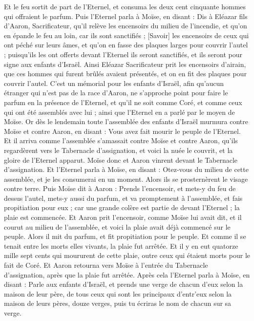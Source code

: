 \begin{multicols}{2}
Et le feu sortit de part de l'Eternel, et consuma les deux cent cinquante hommes qui offraient le parfum.
Puis l'Eternel parla à Moïse, en disant :
Dis à Eléazar fils d'Aaron, Sacrificateur, qu'il relève les encensoirs du milieu de l'incendie, et qu'on en épande le feu au loin, car ils sont sanctifiés ;
[Savoir] les encensoirs de ceux qui ont péché sur leurs âmes, et qu'on en fasse des plaques larges pour couvrir l'autel ; puisqu'ils les ont offerts devant l'Eternel ils seront sanctifiés, et ils seront pour signe aux enfants d'Israël.
Ainsi Eléazar Sacrificateur prit les encensoirs d'airain, que ces hommes qui furent brûlés avaient présentés, et on en fit des plaques pour couvrir l'autel.
C'est un mémorial pour les enfants d'Israël, afin qu'aucun étranger qui n'est pas de la race d'Aaron, ne s'approche point pour faire le parfum en la présence de l'Eternel, et qu'il ne soit comme Coré, et comme ceux qui ont été assemblés avec lui ; ainsi que l'Eternel en a parlé par le moyen de Moïse.
Or dès le lendemain toute l'assemblée des enfants d'Israël murmura contre Moïse et contre Aaron, en disant : Vous avez fait mourir le peuple de l'Eternel.
Et il arriva comme l'assemblée s'amassait contre Moïse et contre Aaron, qu'ils regardèrent vers le Tabernacle d'assignation, et voici la nuée le couvrit, et la gloire de l'Eternel apparut.
Moïse donc et Aaron vinrent devant le Tabernacle d'assignation.
Et l'Eternel parla à Moïse, en disant :
Otez-vous du milieu de cette assemblée, et je les consumerai en un moment. Alors ils se prosternèrent le visage contre terre.
Puis Moïse dit à Aaron : Prends l'encensoir, et mets-y du feu de dessus l'autel, mets-y aussi du parfum, et va promptement à l'assemblée, et fais propitiation pour eux ; car une grande colère est partie de devant l'Eternel ; la plaie est commencée.
Et Aaron prit l'encensoir, comme Moïse lui avait dit, et il courut au milieu de l'assemblée, et voici la plaie avait déjà commencé sur le peuple. Alors il mit du parfum, et fit propitiation pour le peuple.
Et comme il se tenait entre les morts elles vivants, la plaie fut arrêtée.
Et il y en eut quatorze mille sept cents qui moururent de cette plaie, outre ceux qui étaient morts pour le fait de Coré.
Et Aaron retourna vers Moïse à l'entrée du Tabernacle d'assignation, après que la plaie fut arrêtée.
\VerseOne{}Après cela l'Eternel parla à Moïse, en disant :
Parle aux enfants d'Israël, et prends une verge de chacun d'eux selon la maison de leur père, de tous ceux qui sont les principaux d'entr'eux selon la maison de leurs pères, douze verges, puis tu écriras le nom de chacun sur sa verge.

\end{multicols}
